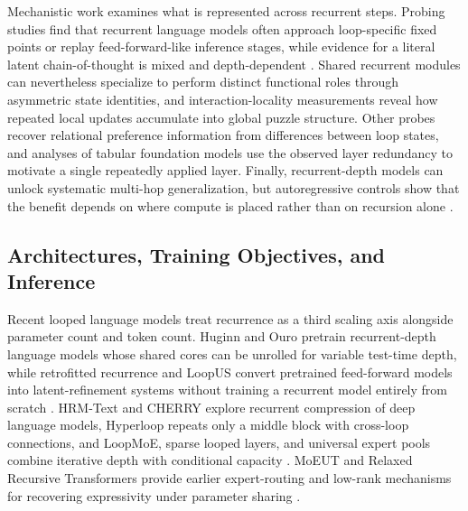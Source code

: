 Mechanistic work examines what is represented across recurrent steps. Probing studies find that recurrent language models often approach loop-specific fixed points or replay feed-forward-like inference stages, while evidence for a literal latent chain-of-thought is mixed and depth-dependent \citep{blayney2026mechanistic,lu2025latentcot}. Shared recurrent modules can nevertheless specialize to perform distinct functional roles through asymmetric state identities, and interaction-locality measurements reveal how repeated local updates accumulate into global puzzle structure. Other probes recover relational preference information from differences between loop states, and analyses of tabular foundation models use the observed layer redundancy to motivate a single repeatedly applied layer. Finally, recurrent-depth models can unlock systematic multi-hop generalization, but autoregressive controls show that the benefit depends on where compute is placed rather than on recursion alone \citep{kohli2026loopthinkgeneralize,rauba2026tarm}.

\subsection{Architectures, Training Objectives, and Inference}

Recent looped language models treat recurrence as a third scaling axis alongside parameter count and token count. Huginn and Ouro pretrain recurrent-depth language models whose shared cores can be unrolled for variable test-time depth, while retrofitted recurrence and LoopUS convert pretrained feed-forward models into latent-refinement systems without training a recurrent model entirely from scratch \citep{geiping2025scalinglatent,zhu2025scalinglatent,mcleish2025retrofitted,park2026loopus}. HRM-Text and CHERRY explore recurrent compression of deep language models, Hyperloop repeats only a middle block with cross-loop connections, and LoopMoE, sparse looped layers, and universal expert pools combine iterative depth with conditional capacity \citep{wang2026hrmtext,kwon2026cherry,zeitoun2026hyperloop,chen2026loopmoe,lee2026sparse}. MoEUT and Relaxed Recursive Transformers provide earlier expert-routing and low-rank mechanisms for recovering expressivity under parameter sharing \citep{csordas2024moeut}.


